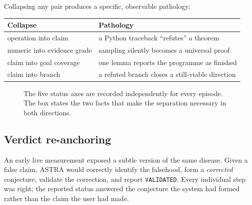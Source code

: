 \documentclass[11pt,a4paper]{article}
\newcommand{\code}[1]{\texttt{\small #1}}
\begin{document}
Collapsing any pair produces a specific, observable pathology:

\begin{center}
\begin{tabular}{@{}ll@{}}
\toprule
\textbf{Collapse} & \textbf{Pathology} \\
\midrule
operation into claim & a Python traceback ``refutes'' a theorem \\
numeric into evidence grade & sampling silently becomes a universal proof \\
claim into goal coverage & one lemma reports the programme as finished \\
claim into branch & a refuted branch closes a still-viable direction \\
\bottomrule
\end{tabular}
\end{center}

\begin{figure}[t]
\centering
{}
\caption{The five status axes are recorded independently for every episode. The
box states the two facts that make the separation necessary in both directions.}
\label{fig:axes}
\end{figure}

\subsection{Verdict re-anchoring}

An early live measurement exposed a subtle version of the same disease. Given a
false claim, ASTRA would correctly identify the falsehood, form a
\emph{corrected} conjecture, validate the correction, and report
\code{VALIDATED}. Every individual step was right; the reported status answered
the conjecture the system had formed rather than the claim the user had made.
\end{document}
